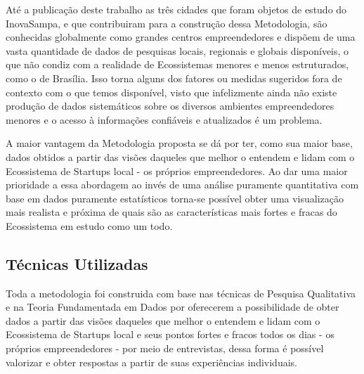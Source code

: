 Até a publicação deste trabalho as três cidades que foram objetos de estudo do InovaSampa, e que contribuiram para a construção dessa Metodologia, são conhecidas globalmente como grandes centros empreendedores e dispõem de uma vasta quantidade de dados de pesquisas locais, regionais e globais disponíveis, o que não condiz com a realidade de Ecossistemas menores e menos estruturados, como o de Brasília. Isso torna alguns dos fatores ou medidas sugeridos fora de contexto com o que temos disponível, visto que infelizmente ainda não existe produção de dados sistemáticos sobre os diversos ambientes empreendedores menores e o acesso à informações confiáveis e atualizados é um problema.


A maior vantagem da Metodologia proposta se dá por ter, como sua maior base, dados obtidos a partir das visões daqueles que melhor o entendem e lidam com o Ecossistema de Startups local - os próprios empreendedores. Ao dar uma maior prioridade a essa abordagem ao invés de uma análise puramente quantitativa com base em dados puramente estatísticos torna-se possível obter uma visualização mais realista e próxima de quais são as características mais fortes e fracas do Ecossistema em estudo como um todo.

\subsection{Técnicas Utilizadas}
\label{subsection:tecnicas_utilizadas}

Toda a metodologia foi construida com base nas técnicas de Pesquisa Qualitativa e na Teoria Fundamentada em Dados por oferecerem a possibilidade de obter dados a partir das visões daqueles que melhor o entendem e lidam com o Ecossistema de Startups local e seus pontos fortes e fracos todos os dias - os próprios empreendedores - por meio de entrevistas, dessa forma é possível valorizar e obter respostas a partir de suas experiências individuais.


